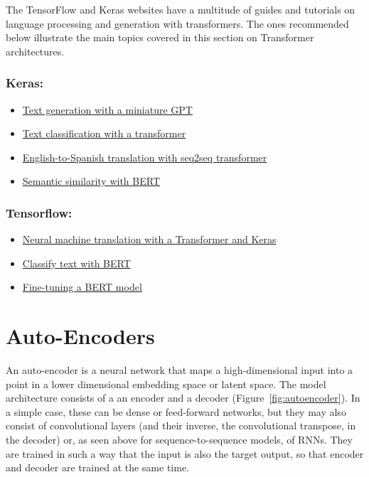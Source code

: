 \FloatBarrier


\begin{resourcebox}
The TensorFlow and Keras websites have a multitude of guides and tutorials on language processing and generation with transformers. The ones recommended below illustrate the main topics covered in this section on Transformer architectures.

\subsubsection*{Keras:}
\begin{itemize}
\item \href{https://keras.io/examples/generative/text_generation_with_miniature_gpt/}{Text generation with a miniature GPT} 
\item \href{https://keras.io/examples/nlp/text_classification_with_transformer/}{Text classification with a transformer} 
\item \href{https://keras.io/examples/nlp/neural_machine_translation_with_transformer/}{English-to-Spanish translation with seq2seq transformer} 
\item \href{https://keras.io/examples/nlp/semantic_similarity_with_bert/}{Semantic similarity with BERT} 
\end{itemize}

\subsubsection*{Tensorflow:}
\begin{itemize}
\item \href{https://www.tensorflow.org/text/tutorials/transformer}{Neural machine translation with a Transformer and Keras} 
\item \href{https://www.tensorflow.org/text/tutorials/classify_text_with_bert}{Classify text with BERT} 
\item \href{https://www.tensorflow.org/tfmodels/nlp/fine_tune_bert}{Fine-tuning a BERT model} 
\end{itemize}
\end{resourcebox}

\section{Auto-Encoders}

An auto-encoder is a neural network that maps a high-dimensional input into a point in a lower dimensional embedding space or latent space. The model architecture consists of a an encoder and a decoder (Figure~\ref{fig:autoencoder}). In a simple case, these can be dense or feed-forward networks, but they may also consist of convolutional layers (and their inverse, the convolutional transpose, in the decoder) or, as seen above for sequence-to-sequence models, of RNNs. They are trained in such a way that the input is also the target output, so that encoder and decoder are trained at the same time.

